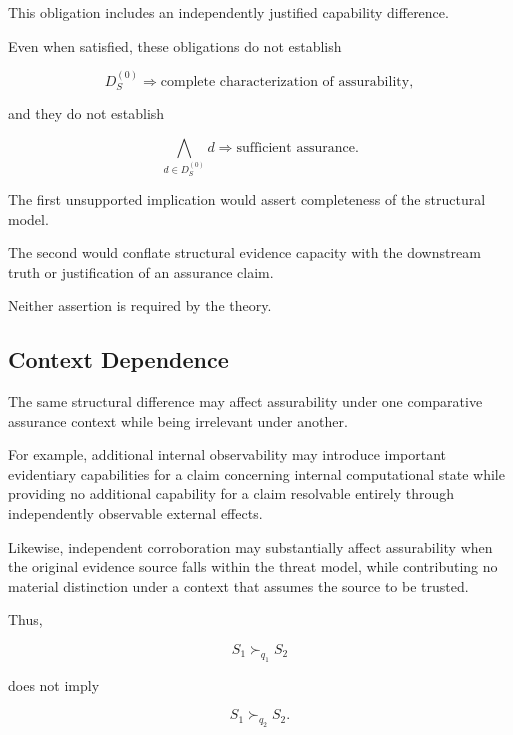This obligation includes an independently justified capability
difference.

Even when satisfied, these obligations do not establish

\begin{equation}
  D_S^{(0)}
  \Longrightarrow
  \text{complete characterization of assurability},
\end{equation}

and they do not establish

\begin{equation}
  \bigwedge_{d\in D_S^{(0)}} d
  \Longrightarrow
  \text{sufficient assurance}.
  \label{eq:no-joint-sufficiency}
\end{equation}

The first unsupported implication would assert completeness of the structural model.

The second would conflate structural evidence capacity with the downstream truth or justification of an assurance claim.

Neither assertion is required by the theory.

\subsection{Context Dependence}
\label{aa.subsec.context-dependence}

The same structural difference may affect assurability under one comparative assurance context while being irrelevant under another.

For example, additional internal observability may introduce
important evidentiary capabilities for a claim concerning internal computational state
while providing no additional capability for a claim resolvable entirely through independently observable external effects.

Likewise, independent corroboration may substantially affect assurability when the original evidence source
falls within the threat model, while contributing no material distinction under a context that assumes the source to be trusted.

Thus,

\begin{equation}
  S_1\succ_{q_1}S_2
\end{equation}

does not imply

\begin{equation}
  S_1\succ_{q_2}S_2.
\end{equation}

